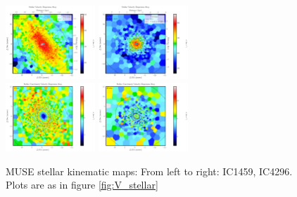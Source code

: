 \begin{figure}
      \\
      \includegraphics[width=0.3\textwidth]{chapter4/Mmaps/ic1459_stellar_sigma.png}
      \includegraphics[width=0.3\textwidth]{chapter4/Mmaps/ic4296_stellar_sigma.png}
      \\
      \includegraphics[width=0.3\textwidth]{chapter4/Mmaps/ic1459_stellar_sigma_uncert.png}
      \includegraphics[width=0.3\textwidth]{chapter4/Mmaps/ic4296_stellar_sigma_uncert.png}
      \\
      \caption[MUSE stellar kinematic maps]{MUSE stellar kinematic maps: From left to right: IC1459, IC4296. Plots are as in figure \ref{fig:V_stellar}}
      \label{fig:MUSE_stellar}
\end{figure}

